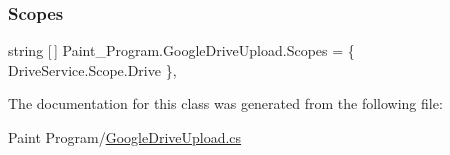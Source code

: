 \mbox{\label{class_paint___program_1_1_google_drive_upload_aa60a9c9a8dd82f038fe5fbb247fc5c38}} 
\subsubsection{\texorpdfstring{Scopes}{Scopes}}
{\footnotesize\ttfamily string \mbox{[}$\,$\mbox{]} Paint\+\_\+\+Program.\+Google\+Drive\+Upload.\+Scopes = \{ Drive\+Service.\+Scope.\+Drive \}\hspace{0.3cm}{\ttfamily [static]}, {\ttfamily [private]}}



The documentation for this class was generated from the following file\+:\begin{DoxyCompactItemize}
\item 
Paint Program/\mbox{\hyperlink{_google_drive_upload_8cs}{Google\+Drive\+Upload.\+cs}}\end{DoxyCompactItemize}
